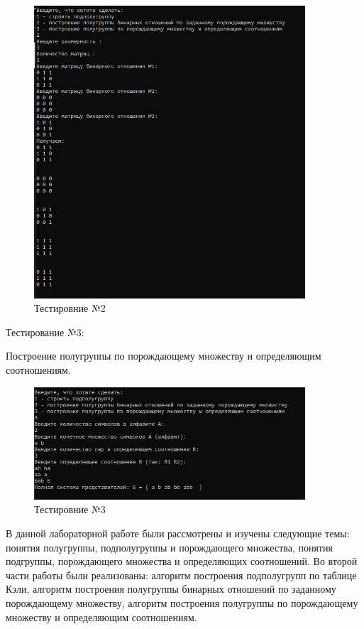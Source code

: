 \documentclass[bachelor, och, labwork]{shiza}
\begin{document}
	\begin{figure}[H]
		\centering
		\includegraphics[width=0.9\textwidth]{test_2}
		\caption{Тестировние №2}
		\label{fig:test_2}
	\end{figure}
	
	Тестирование №3:

Построение полугруппы по порождающему множеству и определяющим соотношениям.

	
	\begin{figure}[H]
		\centering
		\includegraphics[width=0.9\textwidth]{test_3}
		\caption{Тестировние №3}
		\label{fig:test_3}
	\end{figure}
	
	\newpage
	\conclusion %
	
	В данной лабораторной работе были рассмотрены и изучены следующие темы: понятия полугруппы, подполугруппы и порождающего множества, понятия подгруппы, порождающего множества и определяющих соотношений. Во второй части работы были реализованы: алгоритм построения подполугрупп по таблице Кэли, алгоритм построения полугруппы бинарных отношений по заданному порождающему множеству, алгоритм построения полугруппы по порождающему множеству и определяющим соотношениям.  
	  
	
	
	
\end{document}
